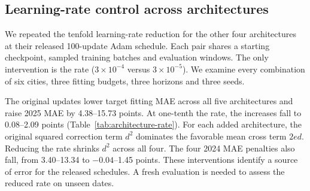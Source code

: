 \subsection{Learning-rate control across architectures}
We repeated the tenfold learning-rate reduction for the other four architectures at their released 100-update Adam schedule. Each pair shares a starting checkpoint, sampled training batches and evaluation windows. The only intervention is the rate ($3\times10^{-4}$ versus $3\times10^{-5}$). We examine every combination of six cities, three fitting budgets, three horizons and three seeds.

\begin{table}[t]
\caption{2025 macro MAE and its change after 100 target updates. Changes are relative to each row's pooled MAE and expressed in AQI points. Positive values mean higher error.}
\label{tab:architecture-rate}
\centering\small

\end{table}

The original updates lower target fitting MAE across all five architectures and raise 2025 MAE by 4.38--15.73 points. At one-tenth the rate, the increases fall to 0.08--2.09 points (Table~\ref{tab:architecture-rate}). For each added architecture, the original squared correction term $d^2$ dominates the favorable mean cross term $2ed$. Reducing the rate shrinks $d^2$ across all four. The four 2024 MAE penalties also fall, from 3.40--13.34 to $-0.04$--1.45 points. These interventions identify a source of error for the released schedules. A fresh evaluation is needed to assess the reduced rate on unseen dates.
